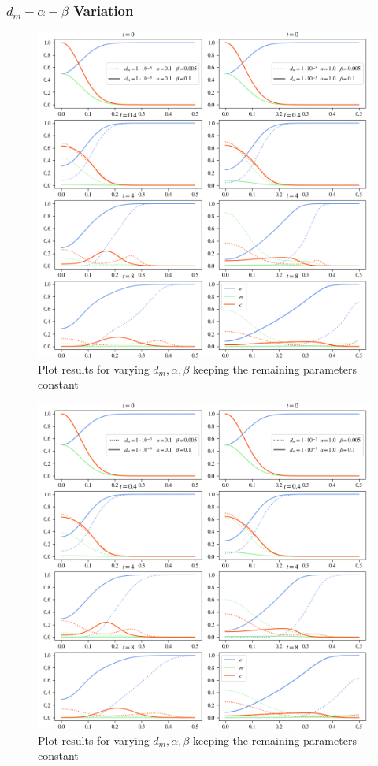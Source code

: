 \subsubsection*{$d_m - \alpha - \beta$ Variation}
\begin{figure}[htb!]
    \centering
    \includegraphics[width=\textwidth]{resources/images/dm_alpha_beta_variation_1.png}
    \caption{Plot results for varying $d_m, \alpha, \beta$ keeping the remaining parameters constant}
    \label{fig:dm_alpha_beta_variation_1}
\end{figure}
\begin{figure}[htb!]
    \centering
    \includegraphics[width=\textwidth]{resources/images/dm_alpha_beta_variation_2.png}
    \caption{Plot results for varying $d_m, \alpha, \beta$ keeping the remaining parameters constant}
    \label{fig:dm_alpha_beta_variation_2}
\end{figure}

